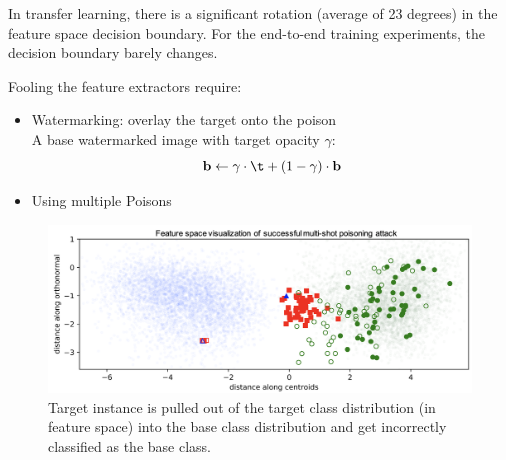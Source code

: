 \documentclass[11pt]{article}
\numberwithin{equation}{section}
\def\bb{{\bf b}}
\begin{document}
In transfer learning, there is a significant rotation (average of 23 degrees) in the feature space decision boundary. For the end-to-end training experiments, the decision boundary barely changes.

Fooling the feature extractors require:
\begin{itemize}
    \item Watermarking: overlay the target onto the poison\\
    A base watermarked image with target opacity $\gamma$:
    \begin{equation*}
        \bb \leftarrow \gamma \cdot \t + (1 - \gamma) \cdot \bb
    \end{equation*}

    \item Using multiple Poisons
\end{itemize}

\begin{figure}[H]
  \centering 
  \hspace{0.3cm} 
  \label{fig:end2end_require} %
\end{figure}

\begin{figure}[!h]
	\centering
	\includegraphics[width=14cm]{figures/end2end_both.png}
	\caption{Target instance is pulled out of the target class distribution (in feature space) into the base class distribution and get incorrectly classified as the base class.}
	\label{fig:end2end_both}
\end{figure}
\end{document}
